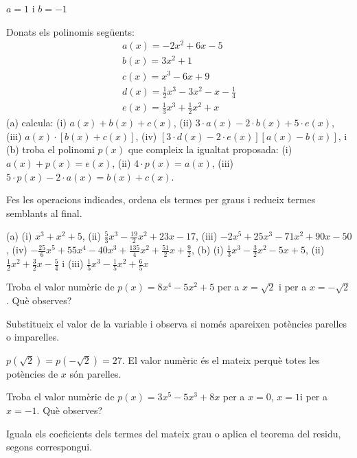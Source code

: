 \begin{solucio}
$a=1$ i $b=-1$
\end{solucio}

\begin{exercici}
Donats els polinomis següents:
\[
\begin{array}{l}
a(x)=-2x^{2}+6x-5 \\
b(x)=3x^{2}+1 \\
c(x)=x^{3}-6x+9 \\
d(x)=\frac{1}{2}x^{3}-3x^{2}-x-\frac{1}{4} \\
e(x)=\frac{1}{3}x^{3}+\frac{1}{2}x^{2}+x
\end{array}
\]
(a) calcula: (i) $a(x)+b(x)+c(x)$, (ii) $3\cdot a(x)-2\cdot b(x)+5\cdot e(x)$, (iii) $a(x)\cdot \left[ b(x)+c(x)\right] $, (iv) $\left[ 3\cdot
d(x)-2\cdot e(x)\right] \left[ a(x)-b(x)\right] $, i (b) troba el polinomi $
p(x)$ que compleix la igualtat proposada: (i) $a(x)+p(x)=e(x)$, (ii) $4\cdot
p(x)=a(x)$, (iii) $5\cdot p(x)-2\cdot a(x)=b(x)+c(x)$.
\end{exercici}
\begin{indicacio}
Fes les operacions indicades, ordena els termes per graus i redueix termes semblants al final.
\end{indicacio}

\begin{solucio}
(a) (i) $x^{3}+x^{2}+5$, (ii) $\frac{5}{3}x^{3}-\frac{19}{2}
x^{2}+23x-17$, (iii) $-2x^{5}+25x^{3}-71x^{2}+90x-50$, (iv) $-\frac{25}{6}
x^{5}+55x^{4}-40x^{3}+\frac{135}{4}x^{2}+\frac{51}{2}x+\frac{9}{2}$, (b) (i)
$\frac{1}{3}x^{3}-\frac{3}{2}x^{2}-5x+5$, (ii) $\frac{1}{2}x^{2}+\frac{3}{2}
x-\frac{5}{4}$ i (iii) $\frac{1}{5}x^{3}-\frac{1}{5}x^{2}+\frac{6}{5}x$
\end{solucio}

\begin{exercici}
Troba el valor numèric de $p(x)=8x^{4}-5x^{2}+5$ per a $x=\sqrt{2}$
i per a $x=-\sqrt{2}$. Què observes?
\end{exercici}
\begin{indicacio}
Substitueix el valor de la variable i observa si només apareixen potències parelles o imparelles.
\end{indicacio}

\begin{solucio}
$p(\sqrt{2})=p(-\sqrt{2})=27$. El valor numèric és el mateix perquè totes les potències de $x$ són parelles.
\end{solucio}

\begin{exercici}
Troba el valor numèric de $p(x)=3x^{5}-5x^{3}+8x$ per a $x=0$, $
x=1 $i per a $x=-1$. Què observes?
\end{exercici}
\begin{indicacio}
Iguala els coeficients dels termes del mateix grau o aplica el teorema del residu, segons correspongui.
\end{indicacio}

